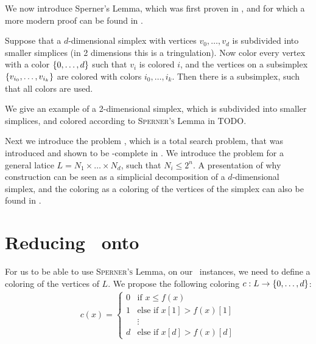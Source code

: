 We now introduce Sperner's Lemma, which was first proven in , and for which a more modern proof can be found in .
\begin{theorem}
    Suppose that a $d$-dimensional simplex with vertices $v_0, \dots, v_d$ is subdivided into smaller simplices (in 2 dimensions this is a tringulation). Now color every vertex with a color $\left\{0, \dots, d\right\}$ such that $v_i$ is colored $i$, and the vertices on a subsimplex $\left\{v_{i_0}, \dots, v_{i_k}\right\}$ are colored with colors $i_0, \dots, i_k$. Then there is a subsimplex, such that all colors are used.
\end{theorem}

We give an example of a 2-dimensional simplex, which is subdivided into smaller simplices, and colored according to \textsc{Sperner's} Lemma in TODO.

Next we introduce the problem \Sperner, which is a total search problem, that was introduced and shown to be \PPAD-complete in . We introduce the problem for a general latice $L = N_1 \times \dots \times N_d$, such that $N_i \leq 2^n$.
A presentation of why construction can be seen as a simplicial decomposition of a $d$-dimensional simplex, and the coloring as a coloring of the vertices of the simplex can also be found in \cite{papadimitriou_complexity_1994-1}.

\section{Reducing \Tarskistar\ onto \Sperner}

For us to be able to use \textsc{Sperner's} Lemma, on our \Tarskistar\ instances, we need to define a coloring of the vertices of $L$. We propose the following coloring $c : L \rightarrow \left\{0, \dots, d\right\}$:
\begin{align*}
    c(x) =
    \begin{cases}
        0 & \text{if $x \leq f(x)$}         \\
        1 & \text{else if $x[1] > f(x)[1]$} \\
          & \vdots                          \\
        d & \text{else if $x[d] > f(x)[d]$}
    \end{cases}
\end{align*}

